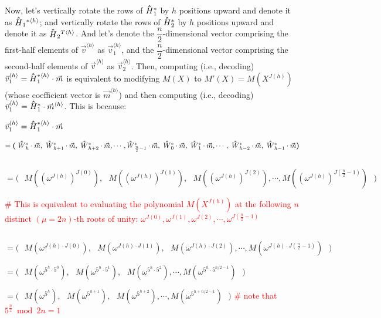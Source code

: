 Now, let's vertically rotate the rows of $\hathat H_1^*$ by $h$ positions upward and denote it as $\hathat H_1{^{*\langle h \rangle}}$; and vertically rotate the rows of $\hathat H_2^*$ by $h$ positions upward and denote it as $\hathat H_2{^{T\langle h \rangle}}$. And let's denote the $\dfrac{n}{2}$-dimensional vector comprising the first-half elements of $\vec{v}^{\langle h \rangle}$ as $\vec{v}_1^{\langle h \rangle}$, and the $\dfrac{n}{2}$-dimensional vector comprising the second-half elements of $\vec{v}^{\langle h \rangle}$ as $\vec{v}_2^{\langle h \rangle}$. 
Then, computing (i.e., decoding) $\vec{v}_1^{\langle h \rangle} = \hathat H_1^{*\langle h \rangle}\cdot \vec{m}$ is equivalent to modifying $M(X)$ to $M'(X) = M(X^{J(h)})$ (whose coefficient vector is $\vec{m}^{\langle h \rangle}$) and then computing (i.e., decoding) $\vec{v}_1^{\langle h \rangle} = \hathat H_1^{*}\cdot \vec{m}^{\langle h \rangle}$. This is because:

$\vec{v}_1^{\langle h \rangle} =\hathat H_1^{*\langle h \rangle}\cdot \vec{m}$

$ = \bm{(} \text{ } \hathat W^*_{h}\cdot\vec{m}, \text{ } \hathat W^*_{h+1}\cdot\vec{m}, \text{ } \hathat W^*_{h+2}\cdot\vec{m}, \cdots, \hathat W^*_{\frac{n}{2}-1}\cdot\vec{m}, \text{ } \hathat W^*_{0}\cdot\vec{m}, \text{ }\hathat W^*_{1}\cdot\vec{m}, \cdots, \text{ } \hathat W^*_{h-2}\cdot\vec{m}, \text{ } \hathat W^*_{h-1}\cdot\vec{m}  \bm{)}$

$ $

$= \bm{(} \text{ } M((\omega^{J(h)})^{J(0)}), \text{ } M((\omega^{J(h)})^{J(1)}), \text{ } M((\omega^{J(h)})^{J(2)}), \cdots, M((\omega^{J(h)})^{J(\frac{n}{2}-1)}) \text{ } \bm{)}$


\textcolor{red}{\# This is equivalent to evaluating the polynomial $M(X^{J(h)})$ at the following $n$ distinct $(\mu=2n)$-th roots of unity: $\omega^{J(0)}, \omega^{J(1)},  \omega^{J(2)}, \cdots, \omega^{J(\frac{n}{2} - 1)}$}

$ $

$= \bm{(} \text{ } M(\omega^{J(h)\cdot J(0)}), \text{ } M(\omega^{J(h)\cdot J(1)}), \text{ } M(\omega^{J(h)\cdot J(2)}), \cdots, M(\omega^{J(h)\cdot J(\frac{n}{2}-1)}) \text{ } \bm{)}$

$= \bm{(} \text{ } M(\omega^{5^h\cdot 5^0}), \text{ } M(\omega^{5^h\cdot 5^1}), \text{ } M(\omega^{5^h\cdot 5^2}), \cdots, M(\omega^{5^h\cdot 5^{n/2-1}}) \text{ } \bm{)}$

$= \bm{(} \text{ } M(\omega^{5^{h}}), \text{ } M(\omega^{5^{h+1}}), \text{ } M(\omega^{5^{h+2}}), \cdots, M(\omega^{5^{h+n/2-1}}) \text{ } \bm{)}$ \textcolor{red}{ \# note that $5^{\frac{n}{2}} \bmod 2n = 1$}

